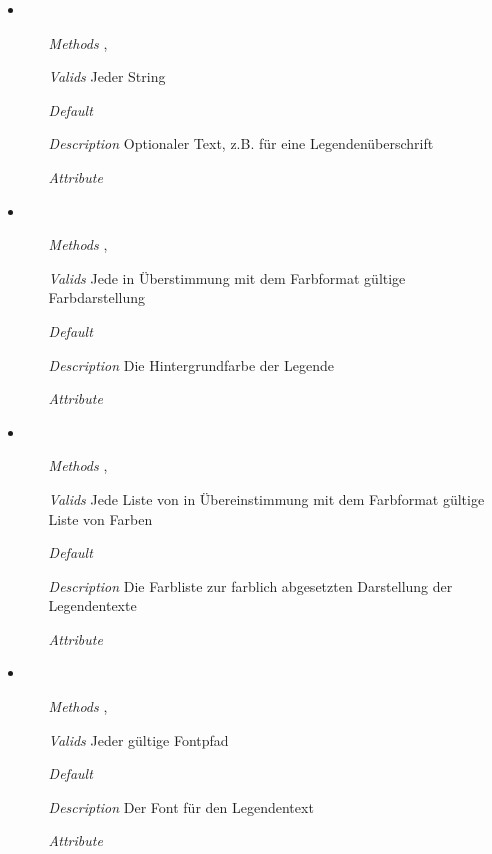 \begin{itemize}
\item {}
\begin{enumerate}
\item[\textit{Methods}] ,
\item[\textit{Valids}] Jeder String
\item[\textit{Default}] 
\item[\textit{Description}] Optionaler Text, z.B. f\"ur eine
  Legenden\"uberschrift
\item[\textit{Attribute}] 
\end{enumerate}

\item {}
\begin{enumerate}
\item[\textit{Methods}] , 
\item[\textit{Valids}] Jede in \"Uberstimmung mit dem Farbformat
  g\"ultige Farbdarstellung
\item[\textit{Default}] 
\item[\textit{Description}] Die Hintergrundfarbe der Legende
\item[\textit{Attribute}] 
\end{enumerate}

\item {}
\begin{enumerate}
\item[\textit{Methods}] ,
\item[\textit{Valids}] Jede Liste von in \"Ubereinstimmung mit dem
  Farbformat g\"ultige Liste von Farben
\item[\textit{Default}] \wancicode{[]}
\item[\textit{Description}] Die Farbliste zur farblich abgesetzten
  Darstellung der Legendentexte
\item[\textit{Attribute}] 
\end{enumerate}

\item {}
\begin{enumerate}
\item[\textit{Methods}] , 
\item[\textit{Valids}] Jeder g\"ultige Fontpfad
\item[\textit{Default}] 
\item[\textit{Description}] Der Font f\"ur den Legendentext
\item[\textit{Attribute}] 
\end{enumerate}


\end{itemize}
